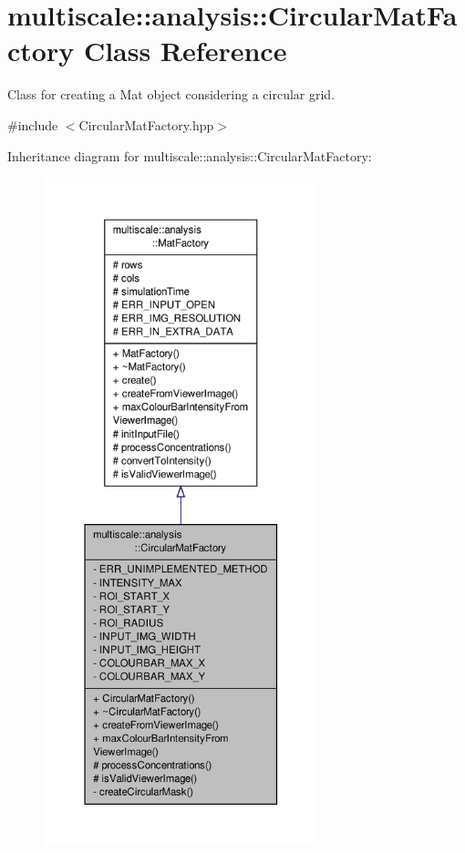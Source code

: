 \hypertarget{classmultiscale_1_1analysis_1_1CircularMatFactory}{\section{multiscale\-:\-:analysis\-:\-:Circular\-Mat\-Factory Class Reference}
\label{classmultiscale_1_1analysis_1_1CircularMatFactory}
}


Class for creating a Mat object considering a circular grid.  




{\ttfamily \#include $<$Circular\-Mat\-Factory.\-hpp$>$}



Inheritance diagram for multiscale\-:\-:analysis\-:\-:Circular\-Mat\-Factory\-:\nopagebreak
\begin{figure}[H]
\begin{center}
\leavevmode
\includegraphics[height=550pt]{classmultiscale_1_1analysis_1_1CircularMatFactory__inherit__graph}
\end{center}
\end{figure}


